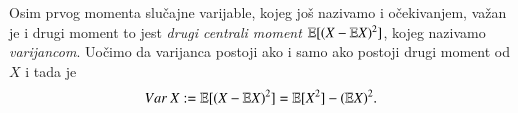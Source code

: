 Osim prvog momenta slu\v cajne varijable, kojeg jo\v s nazivamo i o\v cekivanjem, va\v zan je i drugi moment to jest \emph{drugi centrali moment} $\mathbb{E} [ (X - \mathbb{E} X)^2 ]$, kojeg nazivamo \emph{varijancom}.
Uo\v cimo da varijanca postoji ako i samo ako postoji drugi moment od $X$ i tada je
\begin{equation*}
    Var \: X := \mathbb{E} [ (X - \mathbb{E} X)^2 ] = \mathbb{E} [ X^2 ] - (\mathbb{E} X)^2.
\end{equation*}